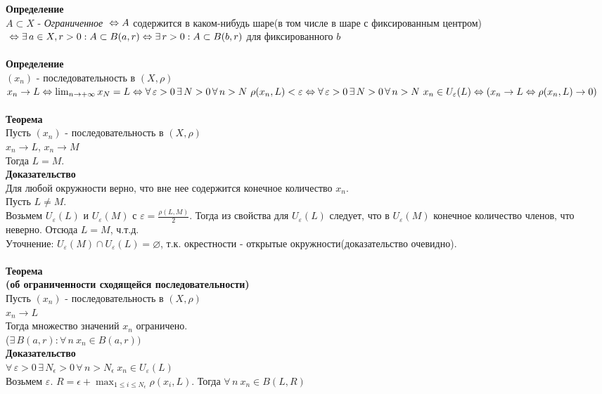 \documentclass[12pt]{article}
\begin{document}
\textbf{Определение}\\
$A \subset X$ - \textit{Ограниченное} $\\\Leftrightarrow A$ содержится в каком-нибудь шаре(в том числе в шаре с фиксированным центром) $\\\Leftrightarrow \exists\,a\in X, r>0: A \subset B(a,r) \\\Leftrightarrow \exists\,r > 0: A\subset B(b,r)$ для фиксированного $b$\\\\
\textbf{Определение}\\
$(x_n)$ - последовательность в $(X,\rho)$\\
$x_n\rightarrow L \\\Leftrightarrow \lim_{n\rightarrow +\infty}{x_N} = L
\\\Leftrightarrow \forall\,\varepsilon>0\,\exists\,N>0\,\forall\,n>N\ \rho(x_n,L)<\varepsilon
\\\Leftrightarrow \forall\,\varepsilon>0\,\exists\,N>0\,\forall\,n>N\ x_n \in U_\varepsilon(L)
\\\Leftrightarrow (x_n\rightarrow L \Leftrightarrow \rho(x_n,L)\rightarrow 0)$\\\\
\textbf{Теорема}\\
Пусть $(x_n)$ - последовательность в $(X,\rho)$\\
$x_n\rightarrow L$, $x_n\rightarrow M$\\
Тогда $L=M$.\\
\textbf{Доказательство}\\
Для любой окружности верно, что вне нее содержится конечное количество $x_n$.\\
Пусть $L\neq M$.\\
Возьмем $U_\varepsilon(L)$ и $U_\varepsilon(M)$ с $\varepsilon = \frac{\rho(L,M)}{2}$. Тогда из свойства для $U_\varepsilon(L)$ следует, что в $U_\varepsilon(M)$ конечное количество членов, что неверно. Отсюда $L=M$, ч.т.д.\\
Уточнение: $U_\varepsilon(M) \cap U_\varepsilon(L) = \varnothing$, т.к. окрестности - открытые окружности(доказательство очевидно).\\\\
\textbf{Теорема\\(об ограниченности сходящейся последовательности)}\\
Пусть $(x_n)$ - последовательность в $(X,\rho)$\\
$x_n\rightarrow L$\\
Тогда множество значений $x_n$ ограничено.\\
($\exists\,B(a,r): \forall\,n\ x_n\in B(a,r))$\\
\textbf{Доказательство}\\
$\forall\,\varepsilon>0\,\exists\,N_\epsilon>0\,\forall\,n>N_\epsilon\ x_n \in U_\varepsilon(L)$\\
Возьмем $\varepsilon$. $R = \epsilon+\max_{1 \leq i \leq N_\epsilon}{\rho(x_i,L)}$. Тогда $\forall\,n\ x_n\in B(L,R)$\\\\
\end{document}
